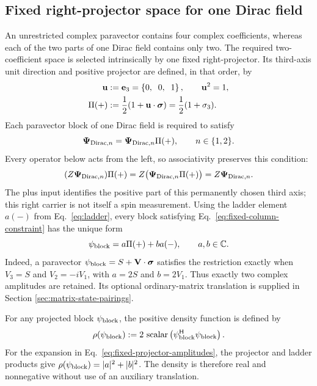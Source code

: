 \documentclass[10pt,letterpaper]{article}
\let\STAamsmathtext\text
\newcommand{\eqtext}[1]{\STAamsmathtext{\normalfont\rmfamily #1}}
\newcommand{\eqfunc}[1]{\operatorname{#1}}
\renewcommand{\text}[1]{\STAamsmathtext{\normalfont\rmfamily #1}}
\newcommand{\C}{\mathbb{C}}
\newcommand{\pv}[1]{#1}
\newcommand{\vct}[1]{\mathbf{#1}}
\newcommand{\sigv}{\vct{\pv{\bm{\sigma}}}}
\newcommand{\bPsi}{\pv{\bm{\Psi}}}
\newcommand{\Hop}{\mathsf H}
\newcommand{\herm}[1]{#1^{\Hop}}
\newcommand{\vthree}[3]{%
  \left\{#1,\mkern10mu #2,\mkern10mu #3\right\}%
}
\begin{document}
\subsection{Fixed right-projector space for one Dirac field}
An unrestricted complex paravector contains four complex coefficients,
whereas each of the two parts of one Dirac field contains only two. The
required two-coefficient space is selected intrinsically by one fixed
right-projector. Its third-axis unit direction and positive projector are
defined, in that order, by
\begin{align}
\vct{u}
&:=\vct{e}_3=\vthree{0}{0}{1},
\qquad \vct{u}^2=1,
\label{eq:fixed-column-axis}\\
\pv{\Pi}(+)
&:=\frac12(1+\vct{u}\cdot\sigv)
=\frac12(1+\pv{\sigma}_3).
\label{eq:fixed-column-carrier}
\end{align}
Each paravector block of one Dirac field is required to satisfy
\begin{equation}
\bPsi_{\eqtext{Dirac},n}
=\bPsi_{\eqtext{Dirac},n}\pv{\Pi}(+),
\qquad n\in\{1,2\}.
\label{eq:fixed-column-constraint}
\end{equation}
Every operator below acts from the left, so associativity preserves this
condition:
\begin{equation}
(\pv{Z}\bPsi_{\eqtext{Dirac},n})\pv{\Pi}(+)
=\pv{Z}\bigl(
\bPsi_{\eqtext{Dirac},n}\pv{\Pi}(+)
\bigr)
=\pv{Z}\bPsi_{\eqtext{Dirac},n}.
\label{eq:fixed-projector-preservation}
\end{equation}
The plus input identifies the positive part of this permanently chosen
third axis; this right carrier is not itself a spin measurement. Using the
ladder element \(\pv{a}(-)\) from
Eq.\ \eqref{eq:ladder}, every block satisfying
Eq.\ \eqref{eq:fixed-column-constraint} has the unique form
\begin{equation}
\pv{\psi}_{\eqtext{block}}
=a\pv{\Pi}(+)+b\pv{a}(-),
\qquad a,b\in\C.
\label{eq:fixed-projector-amplitudes}
\end{equation}
Indeed, a paravector
\(\pv{\psi}_{\eqtext{block}}=S+\vct{V}\cdot\sigv\) satisfies the
restriction exactly when
\(V_3=S\) and \(V_2=-iV_1\), with \(a=2S\) and \(b=2V_1\).
Thus exactly two complex amplitudes are retained. Its optional ordinary-matrix
translation is supplied in Section \ref{sec:matrix-state-pairings}.

For any projected block \(\pv{\psi}_{\eqtext{block}}\), the positive density
function is
defined by
\begin{equation}
\rho(\pv{\psi}_{\eqtext{block}})
:=2\,\eqfunc{scalar}\left(
\herm{\pv{\psi}_{\eqtext{block}}}\pv{\psi}_{\eqtext{block}}
\right).
\label{eq:projected-block-density-function}
\end{equation}
For the expansion in Eq.\ \eqref{eq:fixed-projector-amplitudes}, the
projector and ladder products give
\(\rho(\pv{\psi}_{\eqtext{block}})=|a|^2+|b|^2\). The density is therefore
real and
nonnegative without use of an auxiliary translation.
\end{document}
